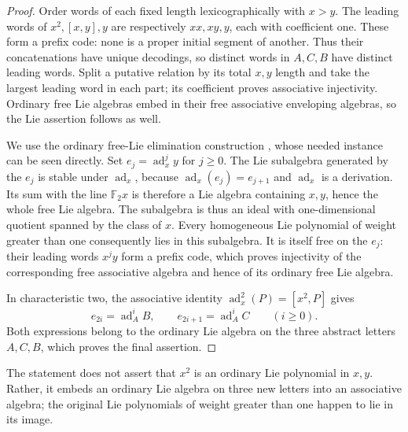 \documentclass[11pt]{article}
\newcommand{\F}{{\mathbb F_2}}
\DeclareMathOperator{\ad}{ad}
\theoremstyle{definition}
\theoremstyle{remark}
\numberwithin{equation}{section}
\begin{document}
\begin{proof}
Order words of each fixed length lexicographically with $x>y$.
The leading words of $x^2,[x,y],y$ are respectively $xx,xy,y$, each with
coefficient one.  These form a prefix code: none is a proper initial
segment of another.  Thus their concatenations have unique decodings,
so distinct words in $A,C,B$ have distinct leading words.  Split a
putative relation by its total $x,y$ length and take the largest
leading word in each part; its coefficient proves associative
injectivity.  Ordinary free Lie algebras embed in their free associative
enveloping algebras, so the Lie assertion follows as well.

We use the ordinary free-Lie elimination construction
\cite[Theorem~0.6]{Reutenauer}, whose needed instance can be seen directly.
Set $e_j=\ad_x^j y$ for $j\geq0$.  The Lie subalgebra generated by the
$e_j$ is stable under $\ad_x$, because $\ad_x(e_j)=e_{j+1}$ and
$\ad_x$ is a derivation.  Its sum with the line $\F x$ is therefore a
Lie algebra containing $x,y$, hence the whole free Lie algebra.  The
subalgebra is thus an ideal with one-dimensional quotient spanned by
the class of $x$.  Every homogeneous Lie polynomial of weight greater
than one consequently lies in this subalgebra.  It is itself free on
the $e_j$: their leading words $x^j y$ form a prefix code, which proves
injectivity of the corresponding free associative algebra and hence
of its ordinary free Lie algebra.

In characteristic two, the associative identity
$\ad_x^2(P)=[x^2,P]$ gives
\begin{equation}\label{eq:elimination-abc}
 e_{2i}=\ad_A^i B,\qquad e_{2i+1}=\ad_A^i C\qquad(i\geq0).
\end{equation}
Both expressions belong to the ordinary Lie algebra on the three
abstract letters $A,C,B$, which proves the final assertion.
\end{proof}

The statement does not assert that $x^2$ is an ordinary Lie polynomial
in $x,y$.  Rather, it embeds an ordinary Lie algebra on three new
letters into an associative algebra; the original Lie polynomials of
weight greater than one happen to lie in its image.
\end{document}
